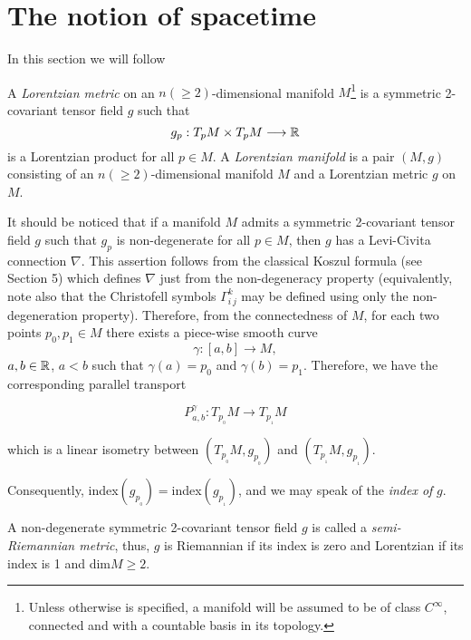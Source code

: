 \chapter{The notion of spacetime}

In this section we will follow \cite{romero10}


A \emph{Lorentzian metric} on an $n(\geq 2)$-dimensional manifold $M$\footnote{Unless otherwise is specified, a manifold will be assumed to be of class $C^{\infty}$, connected and with a countable basis in its topology.} is a symmetric 2-covariant tensor field $g$ such that $$g_p : T_pM\times T_pM \longrightarrow \mathbb{R}$$ is a Lorentzian product for all $p\in M$. A \emph{Lorentzian manifold} is a pair $(M,g)$ consisting of an $n(\geq 2)$-dimensional manifold $M$ and a Lorentzian metric $g$ on $M$.


\vspace{2mm}


It should be noticed that if a manifold $M$ admits a symmetric 2-covariant tensor field $g$ such that $g_p$ is non-degenerate for all $p\in M$, then $g$ has a Levi-Civita connection $\nabla$. This assertion follows from the classical Koszul formula (see Section 5) which defines $\nabla$ just from the non-degeneracy property (equivalently, note also that the Christofell symbols $\Gamma_{i\,j}^k$ may be defined using only the non-degeneration property). Therefore, from the connectedness of $M$, for each two points $p_0,p_1\in M$ there exists a piece-wise smooth curve $$\gamma : [a,b] \longrightarrow M,$$ $a,b\in \mathbb{R}$, $a<b$ such that $\gamma(a)=p_0$ and $\gamma(b)=p_1$. Therefore, we have the corresponding parallel transport

\[

P_{a,b}^{\gamma} : T_{p_{_0}}M \longrightarrow T_{p_{_1}}M

\]

which is a linear isometry between $(T_{p_{_0}}M,g_{p_{_0}})$ and  $(T_{p_{_1}}M,g_{p_{_1}})$.

Consequently, index$(g_{p_{_0}})=$index$(g_{p_{_1}})$, and we may speak of the \emph{index of} $g$.

A non-degenerate symmetric 2-covariant tensor field $g$ is called a \emph{semi-Riemannian metric}, thus, $g$ is Riemannian if its index is zero and Lorentzian if its index is 1 and dim$M\geq 2$.

